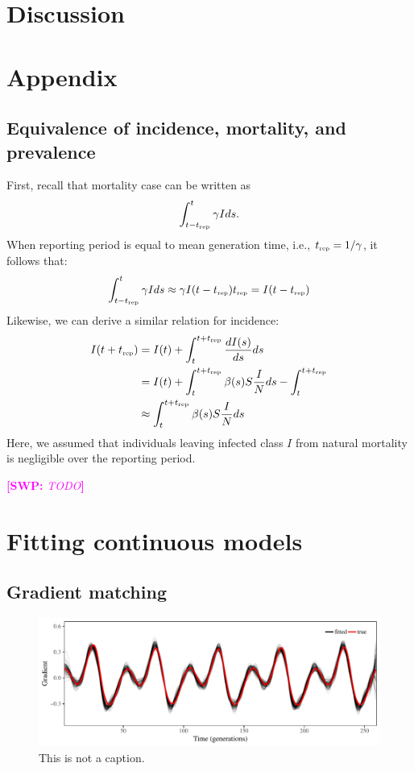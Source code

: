 \documentclass{article}
\newcommand{\comment}[3]{\textcolor{#1}{\textbf{[#2: }\textsl{#3}\textbf{]}}}
\newcommand{\swp}[1]{\comment{magenta}{SWP}{#1}}
\newcommand{\tsub}[2]{#1_{{\textrm{\tiny #2}}}}
\begin{document}
\section{Discussion}




\section{Appendix}

\subsection{Equivalence of incidence, mortality, and prevalence}

First, recall that mortality case can be written as
\begin{equation}
\int_{t-\tsub{t}{rep}}^{t} \gamma I ds.
\end{equation}
When reporting period is equal to mean generation time, i.e., $\tsub{t}{rep} = 1/\gamma$, 
it follows that:
\begin{equation}
\int_{t-\tsub{t}{rep}}^{t} \gamma I ds \approx \gamma I(t-\tsub{t}{rep}) \tsub{t}{rep} = I(t-\tsub{t}{rep})
\end{equation}
Likewise, we can derive a similar relation for incidence:
\begin{equation}
\begin{aligned}
I(t+\tsub{t}{rep}) &= I(t) + \int_{t}^{t+\tsub{t}{rep}} \frac{dI(s)}{ds} ds\\
&= I(t) + \int_{t}^{t+\tsub{t}{rep}} \beta(s) S \frac{I}{N} ds - \int_{t}^{t+\tsub{t}{rep}}\\
&\approx \int_{t}^{t+\tsub{t}{rep}} \beta(s) S \frac{I}{N} ds
\end{aligned}
\end{equation}
Here, we assumed that individuals leaving infected class $I$ from natural mortality is negligible over the reporting period.

\swp{TODO}


\section{Fitting continuous models}

\subsection{Gradient matching}

\begin{figure}[t]
\includegraphics[width=\textwidth]{../figure/gradient_matching_sinusoidal.pdf}
\caption{This is not a caption.}
\end{figure}
\end{document}
